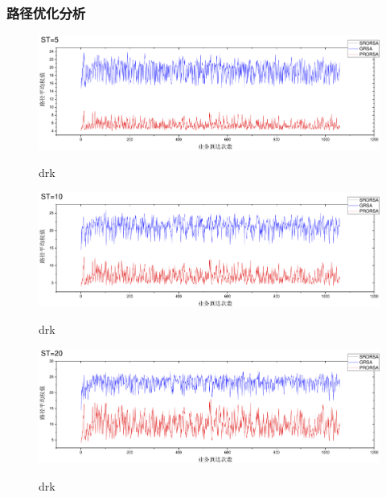 \subsubsection{路径优化分析}
\begin{figure}
\setlength{\belowcaptionskip}{-0.5cm}
  \begin{center}
    {\includegraphics[width=1 \textwidth]{figures/H5C.pdf}}
    \end{center}
  \caption{{\footnotesize{drk}}}
  \label{drk}
\end{figure}
\begin{figure}
\setlength{\belowcaptionskip}{-0.5cm}
  \begin{center}
    {\includegraphics[width=1 \textwidth]{figures/H10C.pdf}}
    \end{center}
  \caption{{\footnotesize{drk}}}
  \label{drk}
\end{figure}
\begin{figure}
\setlength{\belowcaptionskip}{-0.5cm}
  \begin{center}
    {\includegraphics[width=1 \textwidth]{figures/H20C.pdf}}
    \end{center}
  \caption{{\footnotesize{drk}}}
  \label{drk}
\end{figure}
